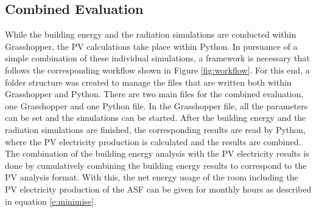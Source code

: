 		\subsection{Combined Evaluation}


			While the building energy and the radiation simulations are conducted within Grasshopper, the PV calculations take place within Python. In pursuance of a simple combination of these individual simulations, a framework is necessary that follows the corresponding workflow shown in Figure \ref{fig:workflow}. For this end, a folder structure was created to manage the files that are written both within Grasshopper and Python. There are two main files for the combined evaluation, one Grasshopper and one Python file. In the Grasshopper file, all the parameters can be set and the simulations can be started. After the building energy and the radiation simulations are finished, the corresponding results are read by Python, where the PV electricity production is calculated and the results are combined. The combination of the building energy analysis with the PV electricity results is done by cumulatively combining the building energy results to correspond to the PV analysis format. With this, the net energy usage of the room including the PV electricity production of the ASF can be given for monthly hours as described in equation \ref{e:minimise}. 
